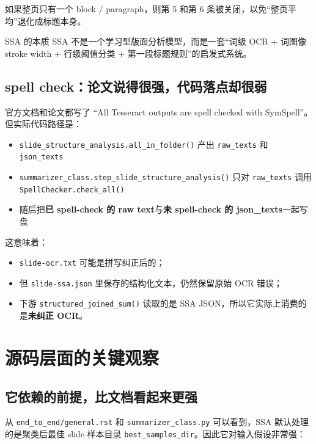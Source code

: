 \documentclass[a4paper]{article}
\begin{document}
如果整页只有一个 block / paragraph，则第 5 和第 6 条被关闭，以免“整页平均”退化成标题本身。

\begin{findingbox}{SSA 的本质}
SSA 不是一个学习型版面分析模型，而是一套“词级 OCR + 词图像 stroke width + 行级阈值分类 + 第一段标题规则”的启发式系统。
\end{findingbox}

\subsection{spell check：论文说得很强，代码落点却很弱}

官方文档和论文都写了 “All Tesseract outputs are spell checked with SymSpell”。但实际代码路径是：

\begin{itemize}
\item \texttt{slide\_structure\_analysis.all\_in\_folder()} 产出 \texttt{raw\_texts} 和 \texttt{json\_texts}
\item \texttt{summarizer\_class.step\_slide\_structure\_analysis()} 只对 \texttt{raw\_texts} 调用 \texttt{SpellChecker.check\_all()}
\item 随后把\textbf{已 spell-check 的 raw text}与\textbf{未 spell-check 的 json\_texts}一起写盘
\end{itemize}

这意味着：

\begin{itemize}
\item \texttt{slide-ocr.txt} 可能是拼写纠正后的；
\item 但 \texttt{slide-ssa.json} 里保存的结构化文本，仍然保留原始 OCR 错误；
\item 下游 \texttt{structured\_joined\_sum()} 读取的是 SSA JSON，所以它实际上消费的是\textbf{未纠正 OCR}。
\end{itemize}

\section{源码层面的关键观察}

\subsection{它依赖的前提，比文档看起来更强}

从 \texttt{end\_to\_end/general.rst} 和 \texttt{summarizer\_class.py} 可以看到，SSA 默认处理的是聚类后最佳 slide 样本目录 \texttt{best\_samples\_dir}。因此它对输入假设非常强：
\end{document}
